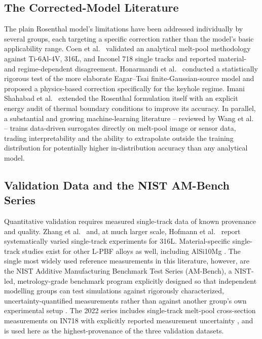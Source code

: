 \documentclass[12pt]{article}
\begin{document}
\subsection{The Corrected-Model Literature}
The plain Rosenthal model's limitations have been addressed individually by several groups, each targeting a specific correction rather than the model's basic applicability range. Coen et al.\ \cite{coen2022} validated an analytical melt-pool methodology against Ti-6Al-4V, 316L, and Inconel 718 single tracks and reported material- and regime-dependent disagreement. Honarmandi et al.\ \cite{honarmandi2021} conducted a statistically rigorous test of the more elaborate Eagar--Tsai finite-Gaussian-source model \cite{eagartsai1983} and proposed a physics-based correction specifically for the keyhole regime. Imani Shahabad et al.\ \cite{imanishahabad2021} extended the Rosenthal formulation itself with an explicit energy audit of thermal boundary conditions to improve its accuracy. In parallel, a substantial and growing machine-learning literature -- reviewed by Wang et al.\ \cite{wang2023} -- trains data-driven surrogates directly on melt-pool image or sensor data, trading interpretability and the ability to extrapolate outside the training distribution for potentially higher in-distribution accuracy than any analytical model.

\subsection{Validation Data and the NIST AM-Bench Series}
Quantitative validation requires measured single-track data of known provenance and quality. Zhang et al.\ \cite{zhang2024} and, at much larger scale, Hofmann et al.\ \cite{hofmann2026} report systematically varied single-track experiments for 316L. Material-specific single-track studies exist for other L-PBF alloys as well, including AlSi10Mg \cite{wei2017}. The single most widely used reference measurements in this literature, however, are the NIST Additive Manufacturing Benchmark Test Series (AM-Bench), a NIST-led, metrology-grade benchmark program explicitly designed so that independent modelling groups can test simulations against rigorously characterized, uncertainty-quantified measurements rather than against another group's own experimental setup \cite{levine2018,lane2022}. The 2022 series includes single-track melt-pool cross-section measurements on IN718 with explicitly reported measurement uncertainty \cite{weaver2024}, and is used here as the highest-provenance of the three validation datasets.
\end{document}
